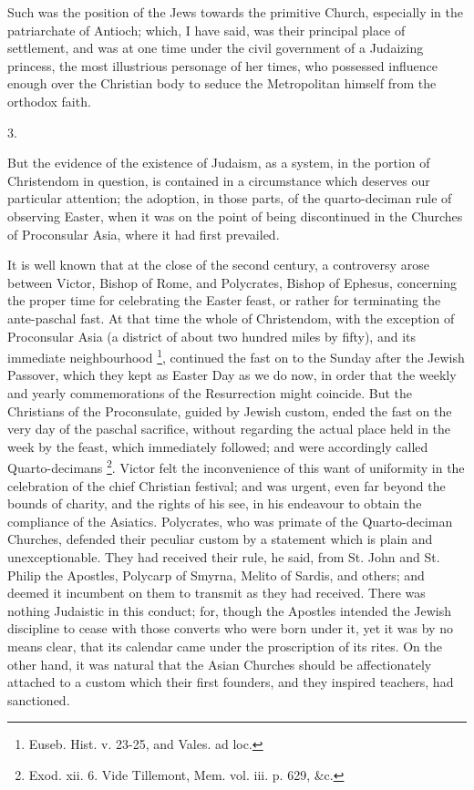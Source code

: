 Such was the position of the Jews towards the primitive Church,
especially in the patriarchate of Antioch; which, I have said, was
their principal place of settlement, and was at one time under the
civil government of a Judaizing princess, the most illustrious
personage of her times, who possessed influence enough over the
Christian body to seduce the Metropolitan himself from the orthodox
faith.

3.

But the evidence of the existence of Judaism, as a system, in the
portion of Christendom in question, is contained in a
circumstance which deserves our particular attention; the adoption, in
those parts, of the quarto-deciman rule of observing Easter, when it
was on the point of being discontinued in the Churches of Proconsular
Asia, where it had first prevailed.

It is well known that at the close of the second century, a
controversy arose between Victor, Bishop of Rome, and Polycrates,
Bishop of Ephesus, concerning the proper time for celebrating the
Easter feast, or rather for terminating the ante-paschal fast. At that
time the whole of Christendom, with the exception of Proconsular Asia
(a district of about two hundred miles by fifty), and its immediate
neighbourhood \footnote{Euseb. Hist. v. 23-25, and Vales. ad loc.},
continued the fast on to the Sunday after the Jewish Passover, which
they kept as Easter Day as we do now, in order that the weekly and
yearly commemorations of the Resurrection might coincide. But the
Christians of the Proconsulate, guided by Jewish custom, ended the
fast on the very day of the paschal sacrifice, without regarding the
actual place held in the week by the feast, which immediately
followed; and were accordingly called Quarto-decimans \footnote{Exod. xii. 6. Vide Tillemont, Mem. vol.
iii. p. 629, \&c.}. Victor felt the inconvenience of this want of uniformity in
the celebration of the chief Christian festival; and was urgent, even
far beyond the bounds of charity, and the rights of his see, in his
endeavour to obtain the compliance of the Asiatics. Polycrates, who
was primate of the Quarto-deciman Churches, defended their peculiar
custom by a statement which is plain and unexceptionable. They had
received their rule, he said, from St. John and St. Philip the
Apostles, Polycarp of Smyrna, Melito of Sardis, and others; and deemed
it incumbent on them to transmit as they had received. There was
nothing Judaistic in this conduct; for, though the Apostles intended
the Jewish discipline to cease with those converts who were born under
it, yet it was by no means clear, that its calendar came under the
proscription of its rites. On the other hand, it was natural that the
Asian Churches should be affectionately attached to a custom which
their first founders, and they inspired teachers, had sanctioned.

